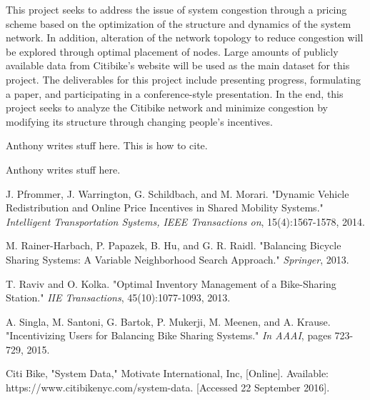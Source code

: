 \documentclass[times, 10pt,twocolumn]{article}
\begin{document}
This project seeks to address the issue of system congestion through a pricing scheme based on the optimization of the structure and dynamics of the system network. In addition, alteration of the network topology to reduce congestion will be explored through optimal placement of nodes. Large amounts of publicly available data from Citibike's website will be used as the main dataset for this project. The deliverables for this project include presenting progress, formulating a paper, and participating in a conference-style presentation. In the end, this project seeks to analyze the Citibike network and minimize congestion by modifying its structure through changing people's incentives.


Anthony writes stuff here. This is how to cite. \cite{redistribution} %


Anthony writes stuff here.

\nocite{ex1,ex2}



\begin{thebibliography}{}

J. Pfrommer, J. Warrington, G. Schildbach, and M. Morari. "Dynamic Vehicle Redistribution and Online Price Incentives in Shared Mobility Systems." \textit{Intelligent Transportation Systems, IEEE Transactions on}, 15(4):1567-1578, 2014.

M. Rainer-Harbach, P. Papazek, B. Hu, and G. R. Raidl. "Balancing Bicycle Sharing Systems: A Variable Neighborhood Search Approach." \textit{Springer}, 2013.

T. Raviv and O. Kolka. "Optimal Inventory Management of a Bike-Sharing Station." \textit{IIE Transactions}, 45(10):1077-1093, 2013.

A. Singla, M. Santoni, G. Bartok, P. Mukerji, M. Meenen, and A. Krause. "Incentivizing Users for Balancing Bike Sharing Systems." \textit{In AAAI}, pages 723-729, 2015.

Citi Bike, "System Data," Motivate International, Inc, [Online]. Available: https://www.citibikenyc.com/system-data. [Accessed 22 September 2016].

\end{thebibliography}
\end{document}
